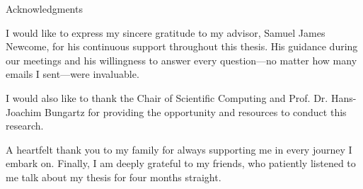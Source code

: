 \thispagestyle{empty}

\vspace*{20mm}

\begin{center}
{ Acknowledgments}
\end{center}

\vspace{10mm}


I would like to express my sincere gratitude to my advisor, Samuel James Newcome, for his continuous support throughout this thesis. His guidance during our meetings and his willingness to answer every question—no matter how many emails I sent—were invaluable.  

I would also like to thank the Chair of Scientific Computing and Prof. Dr. Hans-Joachim Bungartz for providing the opportunity and resources to conduct this research.  

A heartfelt thank you to my family for always supporting me in every journey I embark on. Finally, I am deeply grateful to my friends, who patiently listened to me talk about my thesis for four months straight.  


\cleardoublepage{}
